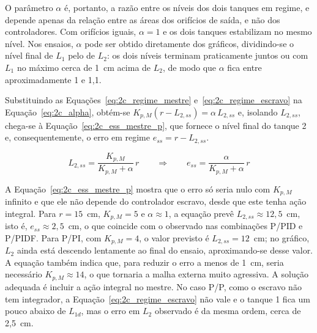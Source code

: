 \documentclass[a4paper,12pt]{article}
\begin{document}
\begin{justify}
    \hspace{4ex}O parâmetro $\alpha$ é, portanto, a razão entre os níveis dos dois tanques em regime, e depende apenas da relação entre as áreas dos orifícios de saída, e não dos controladores. Com orifícios iguais, $\alpha = 1$ e os dois tanques estabilizam no mesmo nível. Nos ensaios, $\alpha$ pode ser obtido diretamente dos gráficos, dividindo-se o nível final de $L_1$ pelo de $L_2$: os dois níveis terminam praticamente juntos ou com $L_1$ no máximo cerca de 1~cm acima de $L_2$, de modo que $\alpha$ fica entre aproximadamente 1 e 1,1.
\end{justify}

\begin{justify}
    \hspace{4ex}Substituindo as Equações~\eqref{eq:2c_regime_mestre} e~\eqref{eq:2c_regime_escravo} na Equação~\eqref{eq:2c_alpha}, obtém-se $K_{p,M}(r - L_{2,ss}) = \alpha\,L_{2,ss}$ e, isolando $L_{2,ss}$, chega-se à Equação~\eqref{eq:2c_ess_mestre_p}, que fornece o nível final do tanque 2 e, consequentemente, o erro em regime $e_{ss} = r - L_{2,ss}$.
\end{justify}

\begin{equation}
    L_{2,ss} = \frac{K_{p,M}}{K_{p,M} + \alpha}\, r
    \qquad\Rightarrow\qquad
    e_{ss} = \frac{\alpha}{K_{p,M} + \alpha}\, r
    \label{eq:2c_ess_mestre_p}
\end{equation}

\begin{justify}
    \hspace{4ex}A Equação~\eqref{eq:2c_ess_mestre_p} mostra que o erro só seria nulo com $K_{p,M}$ infinito e que ele não depende do controlador escravo, desde que este tenha ação integral. Para $r = 15$~cm, $K_{p,M} = 5$ e $\alpha \approx 1$, a equação prevê $L_{2,ss} \approx 12{,}5$~cm, isto é, $e_{ss} \approx 2{,}5$~cm, o que coincide com o observado nas combinações P/PID e P/PIDF. Para P/PI, com $K_{p,M} = 4$, o valor previsto é $L_{2,ss} = 12$~cm; no gráfico, $L_2$ ainda está descendo lentamente ao final do ensaio, aproximando-se desse valor. A equação também indica que, para reduzir o erro a menos de 1~cm, seria necessário $K_{p,M} \approx 14$, o que tornaria a malha externa muito agressiva. A solução adequada é incluir a ação integral no mestre. No caso P/P, como o escravo não tem integrador, a Equação~\eqref{eq:2c_regime_escravo} não vale e o tanque 1 fica um pouco abaixo de $L_{1d}$, mas o erro em $L_2$ observado é da mesma ordem, cerca de 2,5~cm.
\end{justify}
\end{document}
